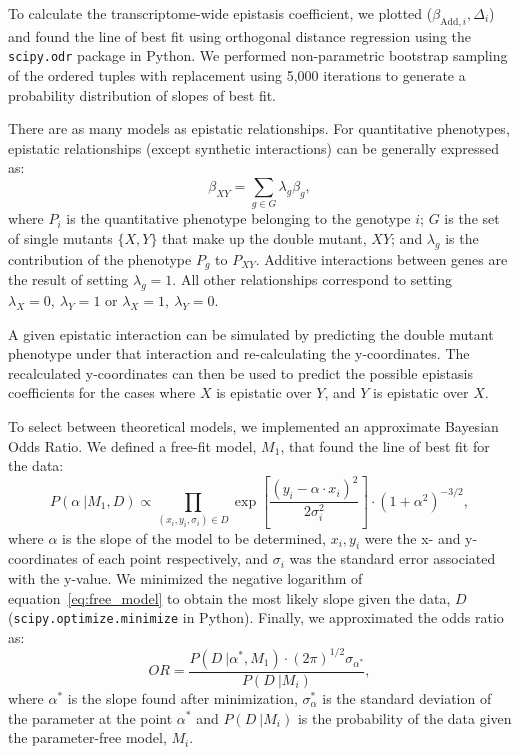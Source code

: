 \documentclass[10pt, onecolumn]{article}
\begin{document}
To calculate the transcriptome-wide epistasis coefficient, we plotted
($\beta_{\mathrm{Add},i}, \Delta_i$) and found the line of best fit using
orthogonal distance regression using the \texttt{scipy.odr} package in Python.
We performed non-parametric bootstrap sampling of the ordered tuples with
replacement using 5,000 iterations to generate a probability distribution of
slopes of best fit.

There are as many models as epistatic relationships. For quantitative phenotypes,
epistatic relationships (except synthetic interactions) can be generally expressed
as:
\begin{equation}
  \beta_{XY} = \sum_{g\in G} \lambda_g \beta_g,
  \label{eq:epi}
\end{equation}
where $P_i$ is the quantitative phenotype belonging to the genotype $i$; $G$ is
the set of single mutants $\{X, Y\}$ that make up the double mutant, $XY$; and
$\lambda_g$ is the contribution of the phenotype $P_g$ to $P_{XY}$. Additive
interactions between genes are the result of setting $\lambda_g=1$. All other
relationships correspond to setting  $\lambda_X=0,~\lambda_Y=1$ or
$\lambda_X=1,~\lambda_Y=0$.

A given epistatic interaction can be simulated by predicting the double mutant
phenotype under that interaction and re-calculating the y-coordinates. The
recalculated y-coordinates can then be used to predict the possible epistasis
coefficients for the cases where $X$ is epistatic over $Y$, and $Y$ is epistatic
over $X$.

To select between theoretical models, we implemented an approximate Bayesian
Odds Ratio. We defined a free-fit model, $M_1$, that found the line of best fit
for the data:
\begin{equation}
  P(\alpha~|M_1, D) \propto \prod_{(x_i, y_i, \sigma_i)\in D}
  \exp{
       [\frac{{(y_i - \alpha\cdot x_i)}^2} %
            {2\sigma_i^2}] %
      } \cdot {(1+\alpha^2)}^{-3/2},
  \label{eq:free_model}
\end{equation}
where $\alpha$ is the slope of the model to be determined, $x_i, y_i$ were the
x- and y-coordinates of each point respectively, and $\sigma_i$ was the standard
error associated with the y-value. We minimized the
negative logarithm of equation~\ref{eq:free_model} to obtain the most likely
slope given the data, $D$ (\texttt{scipy.optimize.minimize} in Python). Finally,
we approximated the odds ratio as:
\begin{equation}
  OR = \frac{
  P(D~|\alpha^*, M_1)\cdot {(2\pi)}^{1/2}\sigma_{\alpha^*} %
  }{P(D~| M_i)}, %
\end{equation}
where $\alpha^*$ is the slope found after minimization, $\sigma_\alpha^*$ is the
standard deviation of the parameter at the point $\alpha^*$ and $P(D~|M_i)$ is the
probability of the data given the parameter-free model, $M_i$.
\end{document}
